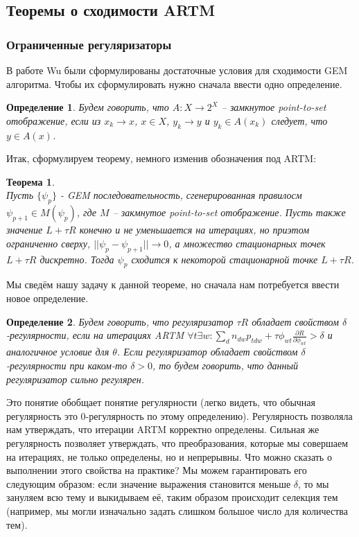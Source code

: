 \documentclass[12pt]{article}
\newtheorem{definition}{Определение}[section]
\newtheorem{theorem}{Теорема}
\begin{document}
	\subsection{Теоремы о сходимости ARTM }
	\subsubsection{Ограниченные регуляризаторы}
	 В работе Wu \cite{wuem} были сформулированы достаточные условия для сходимости GEM алгоритма. Чтобы их сформулировать нужно сначала ввести одно определение.
	\begin{definition}
	Будем говорить, что $A\colon X \to 2^X$ -- замкнутое point-to-set отображение, если из $x_k \to x$, $x \in X$, $y_k \to y$ и $y_k \in A(x_k)$ следует, что $y \in A(x)$.
	\end{definition}
	Итак, сформулируем теорему, немного изменив обозначения под ARTM:
	\begin{theorem} \label{theorem_wu} \ \\
	Пусть $\{\psi_p\}$ - GEM последовательность, сгенерированная правилосм $\psi_{p+1} \in M(\psi_p)$, где $M$ -- закмнутое point-to-set отображение. Пусть также значение $L + \tau R$ конечно и не уменьшается на итерациях, но приэтом ограниченно сверху, $|| \psi_p - \psi_{p+1}|| \to 0$, а множество стационарных точек $L + \tau R$ дискретно. Тогда $\psi_p$ сходится к некоторой стационарной точке $L + \tau R$.
	\end{theorem}
	Мы сведём нашу задачу к данной теореме, но сначала нам потребуется ввести новое определение.
	\begin{definition}
	Будем говорить, что регуляризатор $\tau R$ обладает свойством $\delta$-регулярности, если на итерациях ARTM $\forall t \exists w \colon \sum\limits_d n_{dw} p_{tdw} + \tau\phi_{wt} \frac{\partial{R}}{\partial{\phi_{wt}}} > \delta$ и аналогичное условие для $\theta$. Если регуляризатор  обладает свойством $\delta$-регулярности при каком-то $\delta > 0$, то будем говорить, что данный регуляризатор сильно регулярен.
	\end{definition}
	Это понятие обобщает понятие регулярности (легко видеть, что обычная регулярность это 0-регулярность по этому определению). Регулярность позволяла нам утверждать, что итерации ARTM корректно определены. Сильная же регулярность позволяет утверждать, что преобразования, которые мы совершаем на итерациях, не только определены, но и непрерывны. Что можно сказать о выполнении этого свойства на практике? Мы можем гарантировать его следующим образом: если значение выражения становится меньше $\delta$, то мы зануляем всю тему и выкидываем её, таким образом происходит селекция тем (например, мы могли изначально задать слишком большое число для количества тем).
\end{document}
